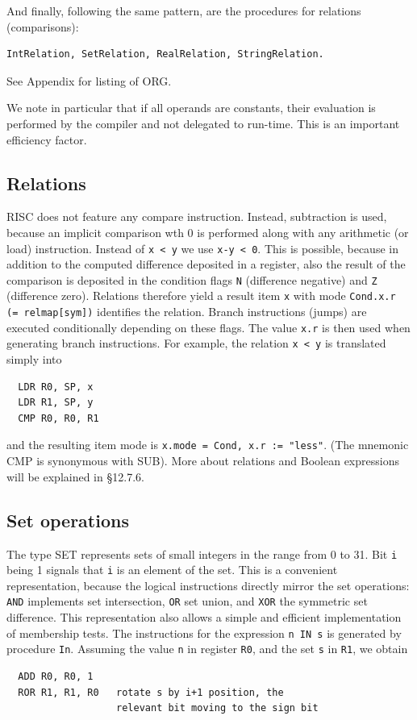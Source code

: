 And finally, following the same pattern, are the procedures for relations (comparisons):
\begin{verbatim}
IntRelation, SetRelation, RealRelation, StringRelation.
\end{verbatim}
See Appendix for listing of ORG.

We note in particular that if all operands are constants, their evaluation is performed by the compiler
and not delegated to run-time.  This is an important efficiency factor.

\subsection{Relations}
RISC does not feature any compare instruction. Instead, subtraction is used, because an implicit
comparison wth 0 is performed along with any arithmetic (or load) instruction. Instead of \verb|x < y|
we use \verb|x-y < 0|. This is possible, because in addition to the computed difference deposited in a
register, also the result of the comparison is deposited in the condition flags \verb|N| (difference
negative) and \verb|Z| (difference zero). Relations therefore yield a result item \verb|x| with mode
\verb|Cond.x.r (= relmap[sym])| identifies the relation. Branch instructions (jumps) are executed
conditionally depending on these flags. The value \verb|x.r| is then used when generating branch
instructions. For example, the relation \verb|x < y| is translated simply into
\begin{verbatim}
  LDR R0, SP, x
  LDR R1, SP, y
  CMP R0, R0, R1
\end{verbatim}

and the resulting item mode is \verb|x.mode = Cond, x.r := "less"|. (The mnemonic CMP is synonymous
with SUB). More about relations and Boolean expressions will be explained in \S 12.7.6.

\subsection{Set operations}
The type SET represents sets of small integers in the range from 0 to 31. Bit \verb|i| being 1 signals
that \verb|i| is an element of the set. This is a convenient representation, because the logical
instructions directly mirror the set operations: \verb|AND| implements set intersection, \verb|OR| set
union, and \verb|XOR| the symmetric set difference. This representation also allows a simple and
efficient implementation of membership tests. The instructions for the expression \verb|n IN s| is
generated by procedure \verb|In|.  Assuming the value \verb|n| in register \verb|R0|, and the set
\verb|s| in \verb|R1|, we obtain
\begin{verbatim}
  ADD R0, R0, 1
  ROR R1, R1, R0   rotate s by i+1 position, the
                   relevant bit moving to the sign bit
\end{verbatim}

